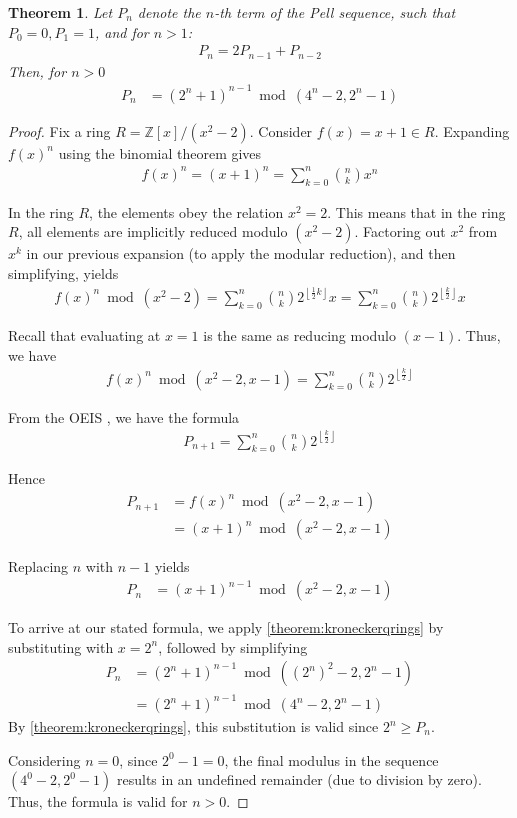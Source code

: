 \documentclass[11pt,reqno]{article}
\theoremstyle{plain}
\newtheorem{theorem}{Theorem}
\theoremstyle{definition}
\newcommand{\floor}[1]{\left\lfloor #1 \right\rfloor}
\begin{document}
\begin{theorem} \label{theorem:pell}
Let $P_n$ denote the $n$-th term of the Pell sequence, such that $P_0 = 0, P_1 = 1$, and for $n > 1$:
\begin{align*}
    P_n = 2 P_{n-1} + P_{n-2}
\end{align*}
Then, for $n > 0$
\begin{align*}
P_n &= (2^n + 1)^{n-1} \bmod{(4^n-2, 2^n-1)}
\end{align*}
\end{theorem}
\begin{proof}
Fix a ring $R = \mathbb{Z}[x]/(x^2 - 2)$. Consider $f(x) = x+1 \in R$. Expanding $f(x)^n$ using the binomial theorem gives
\begin{align*}
    f(x)^n = (x+1)^n = \sum_{k=0}^{n} \binom{n}{k} x^n
\end{align*}

In the ring $R$, the elements obey the relation $x^2 = 2$. This means that in the ring $R$, all elements are implicitly reduced modulo $(x^2 - 2)$. Factoring out $x^2$ from $x^k$ in our previous expansion (to apply the modular reduction), and then simplifying, yields
\begin{align*}
    f(x)^n \bmod{(x^2 - 2)} = \sum_{k=0}^{n} \binom{n}{k} 2^{\floor{\frac{1}{2} k}} x
    = \sum_{k=0}^{n} \binom{n}{k} 2^{\floor{\frac{k}{2}}} x
\end{align*}

Recall that evaluating at $x=1$ is the same as reducing modulo $(x-1)$. Thus, we have
\begin{align*}
    f(x)^n \bmod{(x^2-2, x-1)} = \sum_{k=0}^{n} \binom{n}{k} 2^{\floor{\frac{k}{2}}}
\end{align*}

From the OEIS \cite{A000129}, we have the formula
\begin{align*}
    P_{n+1} = \sum_{k=0}^{n} \binom{n}{k} 2^{\floor{\frac{k}{2}}}
\end{align*}

Hence
\begin{align*}
    P_{n+1} &= f(x)^n \bmod{(x^2-2, x-1)} \\
    &= (x+1)^n \bmod{(x^2-2, x-1)}
\end{align*}

Replacing $n$ with $n-1$ yields
\begin{align*}
    P_n &= (x+1)^{n-1} \bmod{(x^2-2, x-1)}
\end{align*}

To arrive at our stated formula, we apply \cref{theorem:kroneckerqrings} by substituting with $x = 2^n$, followed by simplifying
\begin{align*}
     P_n &= (2^n+1)^{n-1} \bmod{((2^n)^2-2, 2^n-1)} \\
     &= (2^n+1)^{n-1} \bmod{(4^n-2, 2^n-1)}
\end{align*}
By \cref{theorem:kroneckerqrings}, this substitution is valid since $2^n \geq P_n$.

Considering $n = 0$, since $2^0-1 = 0$, the final modulus in the sequence $(4^0-2, 2^0-1)$ results in an undefined remainder (due to division by zero). Thus, the formula is valid for $n > 0$.
\end{proof}
\end{document}
